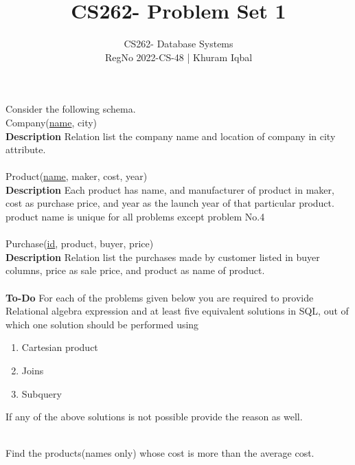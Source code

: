 \documentclass[10pt]{article}
\newenvironment{problem}[2][Problem]{\begin{trivlist}
\item[\hskip \labelsep {\bfseries #1}\hskip \labelsep {\bfseries #2.}]}{\end{trivlist}}
\begin{document}
 
\title{CS262- Problem Set 1}
\author{
CS262- Database Systems\\
RegNo 2022-CS-48 | Khuram Iqbal\\}
\maketitle
\noindent
Consider the following schema.\\
Company(\underline{name}, city)\\
\textbf{Description}
Relation list the company name and location of company in city attribute. \\ \\
\noindent
Product(\underline{name}, maker, cost, year)\\ 
\textbf{Description}
Each product has name, and manufacturer of product in maker, cost as purchase price, and year as the launch year of that particular product. product name is unique for all problems except problem No.4 \\ \\
Purchase(\underline{id}, product, buyer, price)\\
\textbf{Description}
Relation list the purchases made by customer listed in buyer columns, price as sale price, and product as name of product. 
\\ \\
\noindent
\textbf{To-Do} For each of the problems given below you are required to provide Relational algebra expression and at least five equivalent solutions in SQL, out of which one solution should be performed using
\begin{enumerate}
    \item Cartesian product
    \item Joins
    \item Subquery
\end{enumerate}

If any of the above solutions is not possible provide the reason as well.\\ \\

\usepackage[margin=1in]{geometry}
\begin{problem}{1}
Find the products(names only) whose cost is more than the average cost.
\end{problem}
\end{document}
